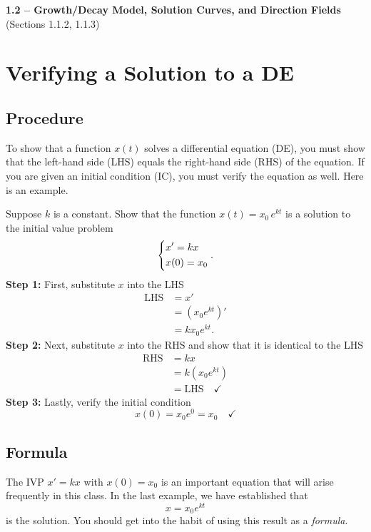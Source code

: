 \documentclass[09pt,letterpaper]{article}
\begin{document}
\begin{center}
\Large\textbf{1.2 – Growth/Decay Model, Solution Curves, and Direction Fields}\\
\normalsize (Sections 1.1.2, 1.1.3)
\end{center}



\section{Verifying a Solution to a DE}

\subsection{Procedure}
To show that a function $x(t)$ solves a differential equation (DE), you must show that the left-hand side (LHS) equals the right-hand side (RHS) of the equation. If you are given an initial condition (IC), you must verify the equation as well. Here is an example.

\begin{example}[1]{
Suppose $k$ is a constant. Show that the function $x(t) = x_0 \,e^{kt}$ is a solution to the initial value problem
$$
\begin{dcases}
    x'=kx\\
    x(0)=x_0
\end{dcases}.
$$
}
\textbf{Step 1:} First, substitute $x$ into the LHS 
\begin{align*}
    \text{LHS} &= x'\\
            &=( x_0e^{kt})'\\
            &=k x_0e^{kt}.
\end{align*}
\textbf{Step 2:} Next, substitute $x$ into the RHS and show that it is identical to the LHS
\begin{align*}
    \text{RHS} &= kx\\ 
               &= k( x_0e^{kt})\\
               &= \text{LHS}\quad \checkmark
\end{align*}
\textbf{Step 3:} Lastly, verify the initial condition  
$$
x(0) = x_0 e^{0}=x_0\quad \checkmark 
$$
\end{example}

\subsection{Formula}
The IVP $x'=kx$ with $x(0)=x_0$ is an important equation that will arise frequently in this class. In the last example, we have established that 
$$
    x = x_0e^{kt}
$$
is the solution. You should get into the habit of using this result as a \textit{formula}. 
\end{document}
